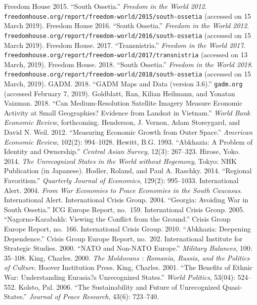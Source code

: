 \documentclass[12pt,a4paper]{article}%
\begin{document}
\begin{thebibliography}{99}
\bibitem{} Freedom House 2015. ``South Ossetia.'' \textit{Freedom in the World 2012}. \verb!freedomhouse.org/report/freedom-world/2015/south-ossetia! (accessed on 15 March 2019).
\bibitem{} Freedom House 2016. ``South Ossetia.'' \textit{Freedom in the World 2012}. \verb!freedomhouse.org/report/freedom-world/2016/south-ossetia! (accessed on 15 March 2019).
\bibitem{} Freedom House. 2017. ``Transnistria.'' \textit{Freedom in the World 2017}. \verb!freedomhouse.org/report/freedom-world/2017/transnistria! (accessed on 13 March, 2019).
\bibitem{} Freedom House. 2018. ``South Ossetia.'' \textit{Freedom in the World 2018}. \verb!freedomhouse.org/report/freedom-world/2018/south-ossetia! (accessed on 15 March, 2019).
\bibitem{} GADM. 2018. ``GADM Maps and Data (version 3.6).'' \verb!gadm.org! (accessed February 7, 2019).
\bibitem{} Goldblatt, Ran, Kilian Heilmann, and Yonatan Vaizman. 2018. ``Can Medium-Resolution Satellite Imagery Measure Economic Activity at Small Geographies? Evidence from Landsat in Vietnam.'' \textit{World Bank Economic Review}, forthcoming.
\bibitem{} Henderson, J. Vernon, Adam Storeygard, and David N. Weil. 2012. ``Measuring Economic Growth from Outer Space.'' \textit{American Economic Review}, 102(2): 994--1028.
\bibitem{} Hewitt, B.G. 1993. ``Abkhazia: A Problem of Identity and Ownership.'' \textit{Central Asian Survey}, 12(3): 267--323.
\bibitem{} Hirose, Yoko. 2014. \textit{The Unrecognized States in the World without Hegemony}, Tokyo: NHK Publication (in Japanese). 
\bibitem{} Hodler, Roland, and Paul A. Raschky. 2014. ``Regional Favoritism.'' \textit{Quarterly Journal of Economics}, 129(2): 995--1033.
\bibitem{} International Alert. 2004. \textit{From War Economies to Peace Economies in the South Caucasus}. International Alert.
\bibitem{} International Crisis Group. 2004. ``Georgia: Avoiding War in South Ossetia.'' ICG Europe Report, no.\ 159.
\bibitem{} International Crisis Group. 2005. ``Nagorno-Karabakh: Viewing the Conflict from the Ground.'' Crisis Group Europe Report, no.\ 166.
\bibitem{} International Crisis Group. 2010. ``Abkhazia: Deepening Dependence.'' Crisis Group Europe Report, no.\ 202. 
\bibitem{} International Institute for Strategic Studies. 2000. ``NATO and Non-NATO Europe.'' \textit{Military Balances}, 100: 35--108.
\bibitem{} King, Charles. 2000. \textit{The Moldovans : Romania, Russia, and the Politics of Culture}. Hoover Institution Press.
\bibitem{} King, Charles. 2001. ``The Benefits of Ethnic War: Understanding Eurasia?s Unrecognized States.'' \textit{World Politics}, 53(04): 524--552.
\bibitem{} Kolsto, Pal. 2006. ``The Sustainability and Future of Unrecognized Quasi-States.'' \textit{Journal of Peace Research}, 43(6): 723--740.

\end{thebibliography}
\end{document}
